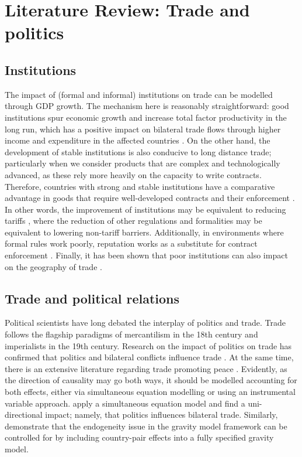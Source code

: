 \section{Literature Review: Trade and politics}

\subsection{Institutions}
The impact of (formal and informal) institutions on trade can be modelled through GDP growth. The mechanism here is reasonably straightforward: good institutions spur economic growth and increase total factor productivity in the long run, which has a positive impact on bilateral trade flows through higher income and expenditure in the affected countries \citep{Acemoglu2001, Acemoglu2002}. On the other hand, the development of stable institutions is also conducive to long distance trade; particularly when we consider products that are complex and technologically advanced, as these rely more heavily on the capacity to write contracts. Therefore, countries with strong and stable institutions have a comparative advantage in goods that require well-developed contracts and their enforcement \citep{Nunn2015, Levchenko2007a}. In other words, the improvement of institutions may be equivalent to reducing tariffs \citep{anderson1999trade}, where the reduction of other regulations and formalities may be equivalent to lowering non-tariff barriers. Additionally, in environments where formal rules work poorly, reputation works as a substitute for contract enforcement \citep{Greif1993ContractCoalition., Greif1994a}. Finally, it has been shown that poor institutions can also impact on the geography of trade \citep{lambsdorff1998empirical}. 

\subsection{Trade and political relations}

Political scientists have long debated the interplay of politics and trade. Trade follows the flagship paradigms of mercantilism in the 18th century and imperialists in the 19th century. Research on the impact of politics on trade has confirmed that politics and bilateral conflicts influence trade \citep{Pollins1989DoesFlag, Pollins1989ConflictFlows, Martin2008, Glick2010}. At the same time, there is an extensive literature regarding trade promoting peace \citep{Polachek1980ConflictTrade,Oneal2001ClearPiece}. Evidently, as the direction of causality may go both ways, it should be modelled accounting for both effects, either via simultaneous equation modelling or using an instrumental variable approach. \cite{Keshk2004} apply a simultaneous equation model and find a uni-directional impact; namely, that politics influences bilateral trade. Similarly, \cite{Glick2010} demonstrate that the endogeneity issue in the gravity model framework can be controlled for by including country-pair effects into a fully specified gravity model.

